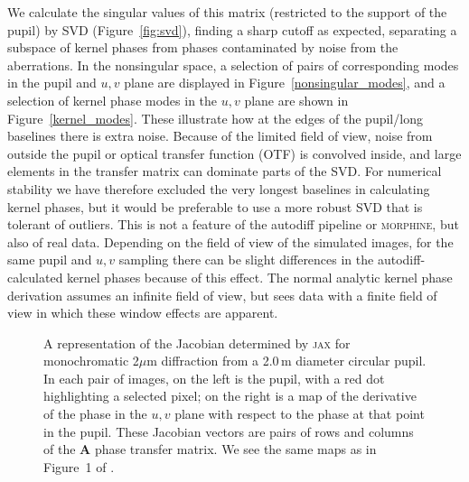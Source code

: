 \documentclass[modern]{aastex63}
\begin{document}
We calculate the singular values of this matrix (restricted to the support of the pupil) by SVD (Figure~\ref{fig:svd}), finding a sharp cutoff as expected, separating a subspace of kernel phases from phases contaminated by noise from the aberrations. In the nonsingular space, a selection of pairs of corresponding modes in the pupil and $u,v$ plane are displayed in Figure~\ref{nonsingular_modes}, and a selection of kernel phase modes in the $u,v$ plane are shown in Figure~\ref{kernel_modes}. These illustrate how at the edges of the pupil/long baselines there is extra noise. Because of the limited field of view, noise from outside the pupil or optical transfer function (OTF) is convolved inside, and large elements in the transfer matrix can dominate parts of the SVD. For numerical stability we have therefore excluded the very longest baselines in calculating kernel phases, but it would be preferable to use a more robust SVD that is tolerant of outliers. This is not a feature of the autodiff pipeline or \textsc{morphine}, but also of real data. Depending on the field of view of the simulated images, for the same pupil and $u,v$ sampling there can be slight differences in the autodiff-calculated kernel phases because of this effect. The normal analytic kernel phase derivation assumes an infinite field of view, but sees data with a finite field of view in which these window effects are apparent. %

\begin{figure}
\caption{A representation of the Jacobian determined by \textsc{jax} for monochromatic 2$\mu$m diffraction from a 2.0\,m diameter circular pupil. In each pair of images, on the left is the pupil, with a red dot highlighting a selected pixel; on the right is a map of the derivative of the phase in the $u,v$ plane with respect to the phase at that point in the pupil. These Jacobian vectors are pairs of rows and columns of the $\mathbf{A}$ phase transfer matrix. We see the same maps as in Figure~1 of \citet{martinache10}. \label{kernel_jacobian}}
\end{figure}
\end{document}
